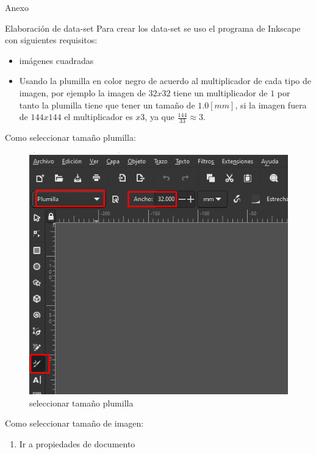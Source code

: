 \documentclass[
  spanish,
  ignorenonframetext,
]{beamer}
\providecommand{\tightlist}{%
  \setlength{\itemsep}{0pt}\setlength{\parskip}{0pt}}
\begin{document}
\begin{frame}{Anexo}
\protect\hypertarget{anexo}{}
\begin{block}{Elaboración de data-set}
\protect\hypertarget{elaboraciuxf3n-de-data-set}{}
Para crear los data-set se uso el programa de Inkscape con siguientes
requisitos:

\begin{itemize}
\tightlist
\item
  imágenes cuadradas
\item
  Usando la plumilla en color negro de acuerdo al multiplicador de cada
  tipo de imagen, por ejemplo la imagen de \(32x32\) tiene un
  multiplicador de \(1\) por tanto la plumilla tiene que tener un tamaño
  de \(1.0[mm]\), si la imagen fuera de \(144x144\) el multiplicador es
  \(x3\), ya que \(\frac{144}{33} \approx 3\).
\end{itemize}

Como seleccionar tamaño plumilla:

\begin{figure}
\centering
\includegraphics{img/README/image-20220516010023659.png}
\caption{seleccionar tamaño plumilla}
\end{figure}

Como seleccionar tamaño de imagen:

\begin{enumerate}
\tightlist
\item
  Ir a propiedades de documento
\end{enumerate}


\end{block}
\end{frame}
\end{document}

